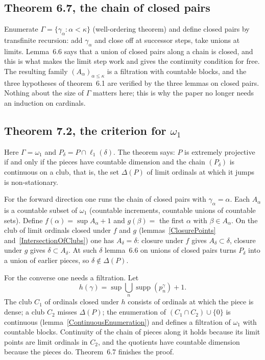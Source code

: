 \documentclass[12pt]{article}
\theoremstyle{definition}
\theoremstyle{remark}
\newcommand{\ellone}[1]{\ell_1(#1)}
\newcommand{\supp}{\operatorname{supp}}
\begin{document}
\subsection*{Theorem 6.7, the chain of closed pairs}

Enumerate $\Gamma=\{\gamma_\alpha:\alpha<\kappa\}$ (well-ordering theorem)
and define closed pairs by transfinite recursion: add $\gamma_\alpha$ and
close off at successor steps, take unions at limits. Lemma~6.6 says that a
union of closed pairs along a chain is closed, and this is what makes the
limit step work and gives the continuity condition for free. The resulting
family ${(A_\alpha)}_{\alpha\leq\kappa}$ is a filtration with countable blocks,
and the three hypotheses of theorem~6.1 are verified by the three lemmas on
closed pairs. Nothing about the size of $\Gamma$ matters here; this is why
the paper no longer needs an induction on cardinals.

\subsection*{Theorem 7.2, the criterion for $\omega_1$}

Here $\Gamma=\omega_1$ and $P_\delta=P\cap\ellone{\delta}$. The theorem says:
$P$ is extremely projective if and only if the pieces have countable
dimension and the chain ${(P_\delta)}$ is continuous on a club, that is, the
set $\Delta(P)$ of limit ordinals at which it jumps is non-stationary.

For the forward direction one runs the chain of closed pairs with
$\gamma_\alpha=\alpha$. Each $A_\alpha$ is a countable subset of $\omega_1$
(countable increments, countable unions of countable sets). Define
$f(\alpha)=\sup A_\alpha+1$ and $g(\beta)=$ the first $\alpha$ with
$\beta\in A_\alpha$. On the club of limit ordinals closed under $f$ and $g$
(lemmas~\ref{ClosurePoints} and~\ref{IntersectionOfClubs}) one has
$A_\delta=\delta$: closure under $f$ gives $A_\delta\subset\delta$, closure
under $g$ gives $\delta\subset A_\delta$. At such $\delta$ lemma~6.6 on unions of
closed pairs turns $P_\delta$ into a union of earlier pieces, so
$\delta\notin\Delta(P)$.

For the converse one needs a filtration. Let
\[
h(\gamma)=\sup\textstyle\bigcup_n\supp(p^\gamma_n)+1 .
\]
The club $C_1$ of ordinals closed under $h$ consists of ordinals at
which the piece is dense; a club $C_2$ misses $\Delta(P)$; the enumeration
of $(C_1\cap C_2)\cup\{0\}$ is continuous
(lemma~\ref{ContinuousEnumeration}) and
defines a filtration of $\omega_1$ with countable blocks. Continuity of the
chain of pieces along it holds because its limit points are limit ordinals
in $C_2$, and the quotients have countable dimension because the pieces do. Theorem~6.7
finishes the proof.
\end{document}
